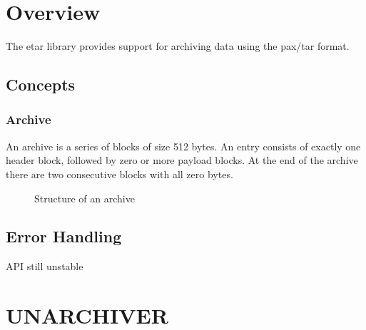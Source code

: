 \documentclass[a4paper]{report}
\begin{document}
\chapter{Overview}
The etar library provides support for archiving data using the pax/tar format.

\section{Concepts}
\subsection{Archive}
An archive is a series of blocks of size 512 bytes. An entry consists of exactly
one header block, followed by zero or more payload blocks. At the end of the
archive there are two consecutive blocks with all zero bytes.

\begin{figure}[h]
	\begin{center}
		
	\end{center}
	\caption{Structure of an archive}
\end{figure}

\section{Error Handling}
API still unstable






\chapter{UNARCHIVER}
\end{document}

